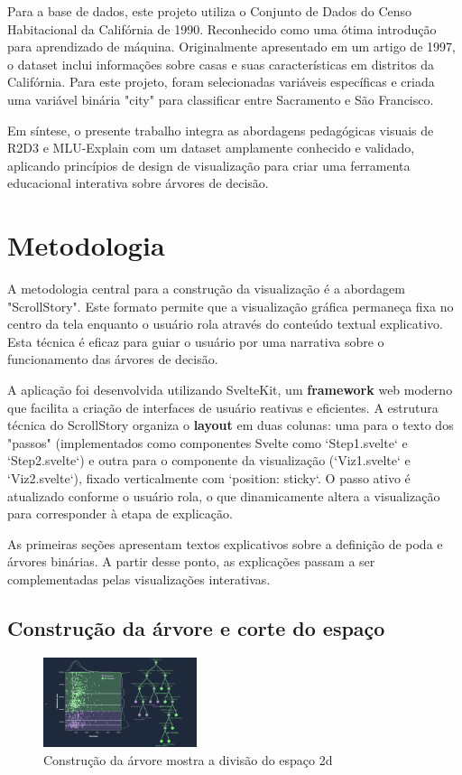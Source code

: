 \documentclass[conference]{IEEEtran}
\begin{document}
Para a base de dados, este projeto utiliza o Conjunto de Dados do Censo Habitacional da Califórnia de 1990. Reconhecido como uma ótima introdução para aprendizado de máquina. Originalmente apresentado em um artigo de 1997, o dataset inclui informações sobre casas e suas características em distritos da Califórnia. Para este projeto, foram selecionadas variáveis específicas e criada uma variável binária "city" para classificar entre Sacramento e São Francisco.

Em síntese, o presente trabalho integra as abordagens pedagógicas visuais de R2D3 e MLU-Explain com um dataset amplamente conhecido e validado, aplicando princípios de design de visualização para criar uma ferramenta educacional interativa sobre árvores de decisão.


\section{Metodologia}
A metodologia central para a construção da visualização é a abordagem "ScrollStory". Este formato permite que a visualização gráfica permaneça fixa no centro da tela enquanto o usuário rola através do conteúdo textual explicativo. Esta técnica é eficaz para guiar o usuário por uma narrativa sobre o funcionamento das árvores de decisão.

A aplicação foi desenvolvida utilizando SvelteKit, um \textbf{framework} web moderno que facilita a criação de interfaces de usuário reativas e eficientes. A estrutura técnica do ScrollStory organiza o \textbf{layout} em duas colunas: uma para o texto dos "passos" (implementados como componentes Svelte como `Step1.svelte` e `Step2.svelte`) e outra para o componente da visualização (`Viz1.svelte` e `Viz2.svelte`), fixado verticalmente com `position: sticky`. O passo ativo é atualizado conforme o usuário rola, o que dinamicamente altera a visualização para corresponder à etapa de explicação.

As primeiras seções apresentam textos explicativos sobre a definição de poda e árvores binárias. A partir desse ponto, as explicações passam a ser complementadas pelas visualizações interativas.

\subsection{Construção da árvore e corte do espaço}
\begin{figure}[h]
    \centering
    \includegraphics[width=0.4\textwidth]{treeCut.png}
    \caption{Construção da árvore mostra a divisão do espaço 2d}
    \label{fig:minha_imagem}
\end{figure}
\end{document}
